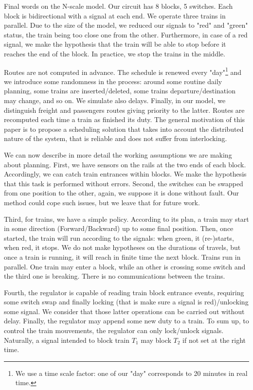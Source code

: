 \documentclass[runningheads]{llncs}
\begin{document}
Final words on the N-scale model. Our circuit has 8 blocks, 5 switches. Each block is bidirectional with a signal at each end.  We operate  three trains in parallel. Due to the size of the model, we reduced our signals  to "red" and "green" status, the train being too close one from the other. Furthermore, in case of a red signal, we make the hypothesis that the train will be able to stop before it reaches the end of the block. In practice, we stop the trains in the middle. 


Routes are not computed in advance. The schedule is renewed every "day"\footnote{We use a time scale factor: one of our "day" corresponds to 20 minutes in real time.}  and we introduce some randomness in the process: around some routine daily planning, some trains are inserted/deleted, some trains departure/destination may change, and so on. We simulate also delays. Finally, in our model, we distinguish freight and  passengers routes giving priority to the latter. Routes are recomputed each time a train as finished its duty. The general motivation of this paper is to propose a scheduling solution that takes into account the distributed nature of the system, that is reliable and does not suffer from interlocking.  
 
We can now describe in more detail the working assumptions we are making about planning.  First, we have sensors on the rails at the two ends of each block. Accordingly,  we can catch train entrances within blocks. We make the hypothesis that this task is performed without errors. Second, the switches can be swapped from one position to the other, again, we suppose it is done without fault. Our method could cope such issues, but we leave that for future work. 
 
  Third, for trains, we have a simple policy.  According to its plan, a train may start in some direction (Forward/Backward) up to some final position. Then, once started, the train will run according to the signals: when green, it (re-)starts, when red, it stops.  We do not make hypotheses on the durations of travels, but once a train is running, it will reach in finite time the next block. Trains run in parallel. One train may enter a block, while an other is crossing some switch and the third one is breaking. There is no communications between the trains.

Fourth,  the regulator is capable of reading train block entrance events, requiring some switch swap and finally locking (that is make sure a signal is red)/unlocking some signal. We consider that those latter operations can be carried out without delay. Finally, the regulator may append some new duty to a train. To sum up, to control the train mouvements, the regulator can only lock/unlock signals. Naturally, a signal intended to block train $T_1$ may block $T_2$ if not set at the right time.   
 
\end{document}
